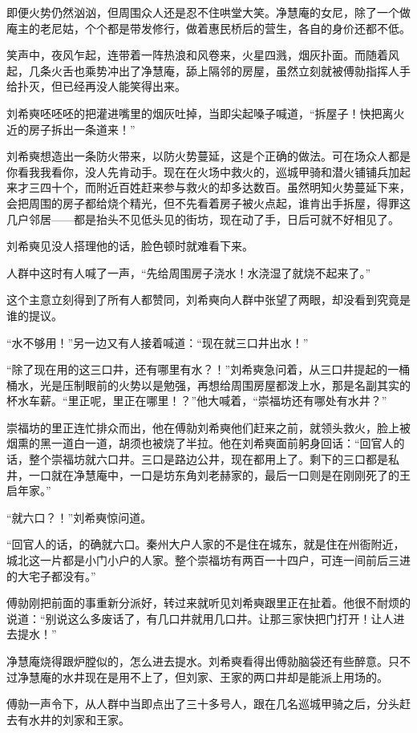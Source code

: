 即便火势仍然汹汹，但周围众人还是忍不住哄堂大笑。净慧庵的女尼，除了一个做庵主的老尼姑，个个都是带发修行，做着惠民桥后的营生，各自的身价还都不低。

笑声中，夜风乍起，连带着一阵热浪和风卷来，火星四溅，烟灰扑面。而随着风起，几条火舌也乘势冲出了净慧庵，舔上隔邻的房屋，虽然立刻就被傅勍指挥人手给扑灭，但已经再没人能笑得出来。

刘希奭呸呸呸的把灌进嘴里的烟灰吐掉，当即尖起嗓子喊道，“拆屋子！快把离火近的房子拆出一条道来！”

刘希奭想造出一条防火带来，以防火势蔓延，这是个正确的做法。可在场众人都是你看我我看你，没人先肯动手。现在在火场中救火的，巡城甲骑和潜火铺铺兵加起来才三四十个，而附近百姓赶来参与救火的却多达数百。虽然明知火势蔓延下来，会把周围的房子都给烧个精光，但不先看着房子被火点起，谁肯出手拆屋，得罪这几户邻居——都是抬头不见低头见的街坊，现在动了手，日后可就不好相见了。

刘希奭见没人搭理他的话，脸色顿时就难看下来。

人群中这时有人喊了一声，“先给周围房子浇水！水浇湿了就烧不起来了。”

这个主意立刻得到了所有人都赞同，刘希奭向人群中张望了两眼，却没看到究竟是谁的提议。

“水不够用！”另一边又有人接着喊道：“现在就三口井出水！”

“除了现在用的这三口井，还有哪里有水？！”刘希奭急问着，从三口井提起的一桶桶水，光是压制眼前的火势以是勉强，再想给周围房屋都泼上水，那是名副其实的杯水车薪。“里正呢，里正在哪里！？”他大喊着，“崇福坊还有哪处有水井？”

崇福坊的里正连忙排众而出，他在傅勍刘希奭他们赶来之前，就领头救火，脸上被烟熏的黑一道白一道，胡须也被烧了半拉。他在刘希奭面前躬身回话：“回官人的话，整个崇福坊就六口井。三口是路边公井，现在都用上了。剩下的三口都是私井，一口就在净慧庵中，一口是坊东角刘老赫家的，最后一口则是在刚刚死了的王启年家。”

“就六口？！”刘希奭惊问道。

“回官人的话，的确就六口。秦州大户人家的不是住在城东，就是住在州衙附近，城北这一片都是小门小户的人家。整个崇福坊有两百一十四户，可连一间前后三进的大宅子都没有。”

傅勍刚把前面的事重新分派好，转过来就听见刘希奭跟里正在扯着。他很不耐烦的说道：“别说这么多废话了，有几口井就用几口井。让那三家快把门打开！让人进去提水！”

净慧庵烧得跟炉膛似的，怎么进去提水。刘希奭看得出傅勍脑袋还有些醉意。只不过净慧庵的水井现在是用不上了，但刘家、王家的两口井却是能派上用场的。

傅勍一声令下，从人群中当即点出了三十多号人，跟在几名巡城甲骑之后，分头赶去有水井的刘家和王家。


